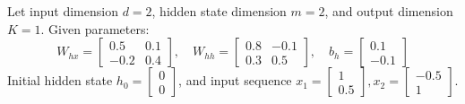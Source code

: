 \documentclass[a4paper,11pt]{article}
\begin{document}
\begin{worked}
Let input dimension $d = 2$, hidden state dimension $m = 2$, and output dimension $K = 1$. Given parameters:
$$W_{hx} = \begin{bmatrix} 0.5 & 0.1 \\ -0.2 & 0.4 \end{bmatrix}, \quad W_{hh} = \begin{bmatrix} 0.8 & -0.1 \\ 0.3 & 0.5 \end{bmatrix}, \quad b_h = \begin{bmatrix} 0.1 \\ -0.1 \end{bmatrix}$$
Initial hidden state $h_0 = \begin{bmatrix} 0 \\ 0 \end{bmatrix}$, and input sequence $x_1 = \begin{bmatrix} 1 \\ 0.5 \end{bmatrix}, x_2 = \begin{bmatrix} -0.5 \\ 1 \end{bmatrix}$.


\end{worked}
\end{document}
